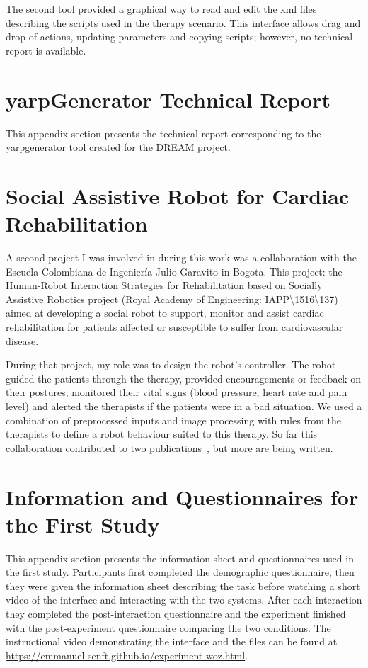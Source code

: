 The second tool provided a graphical way to read and edit the xml files describing the scripts used in the therapy scenario. This interface allows drag and drop of actions, updating parameters and copying scripts; however, no technical report is available.

\cleartooddpage
\chapter{yarpGenerator Technical Report} \label{app:yarpgenerator}
This appendix section presents the technical report corresponding to the yarpgenerator tool created for the DREAM project.

\cleartooddpage
\chapter{Social Assistive Robot for Cardiac Rehabilitation} \label{app:Colombia}

A  second project I was involved in during this work was a collaboration with the Escuela Colombiana de Ingeniería Julio Garavito in Bogota. This project:  the Human-Robot Interaction Strategies for Rehabilitation based on Socially Assistive Robotics project (Royal Academy of Engineering: IAPP\textbackslash1516\textbackslash137) aimed at developing a social robot to support, monitor and assist cardiac rehabilitation for patients affected or susceptible to suffer from cardiovascular disease.

During that project, my role was to design the robot's controller. The robot guided the patients through the therapy, provided encouragements or feedback on their postures, monitored their vital signs (blood pressure, heart rate and pain level) and alerted the therapists if the patients were in a bad situation. We used a combination of preprocessed inputs and image processing with rules from the therapists to define a robot behaviour suited to this therapy. So far this collaboration contributed to two publications~\citep{lara2017human,casas2018social}, but more are being written.

\cleartooddpage
\chapter{Information and Questionnaires for the First Study} \label{app:woz_questionnaires}
This appendix section presents the information sheet and questionnaires used in the first study. Participants first completed the demographic questionnaire, then they were given the information sheet describing the task before watching a short video of the interface and interacting with the two systems. After each interaction they completed the post-interaction questionnaire and the experiment finished with the post-experiment questionnaire comparing the two conditions. The instructional video demonstrating the interface and the files can be found at  \url{https://emmanuel-senft.github.io/experiment-woz.html}.


